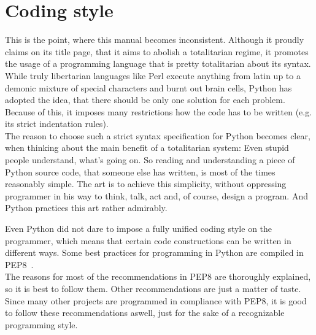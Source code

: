 	\section{Coding style}
		This is the point, where this manual becomes inconsistent.
		Although it proudly claims on its title page, that it aims to abolish a totalitarian regime, it promotes the usage of a programming language that is pretty totalitarian about its syntax.\\
		While truly libertarian languages like Perl execute anything from latin up to a demonic mixture of special characters and burnt out brain cells, Python has adopted the idea, that there should be only one solution for each problem.
		Because of this, it imposes many restrictions how the code has to be written (e.g. its strict indentation rules).\\
		The reason to choose such a strict syntax specification for Python becomes clear, when thinking about the main benefit of a totalitarian system:
		Even stupid people understand, what's going on.
		So reading and understanding a piece of Python source code, that someone else has written, is most of the times reasonably simple.
		The art is to achieve this simplicity, without oppressing programmer in his way to think, talk, act and, of course, design a program.
		And Python practices this art rather admirably.

		Even Python did not dare to impose a fully unified coding style on the programmer, which means that certain code constructions can be written in different ways.
		Some best practices for programming in Python are compiled in PEP8~\cite{PEP8}.\\
		The reasons for most of the recommendations in PEP8 are thoroughly explained, so it is best to follow them.
		Other recommendations are just a matter of taste.
		Since many other projects are programmed in compliance with PEP8, it is good to follow these recommendations aswell, just for the sake of a recognizable programming style.

